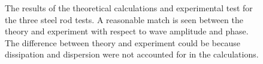  \begin{figure}[ht!]
\begin{subfigmatrix}{3}
\end{subfigmatrix}

   \caption
   { \label{fig:steelThExp}
The results of the theoretical calculations and experimental test for the three steel rod tests. A reasonable match is seen between the theory and experiment with respect to wave amplitude and phase. The difference between theory and experiment could be because dissipation and dispersion were not accounted for in the calculations.
 }
 \end{figure}
 
